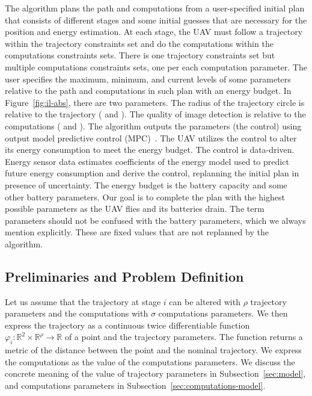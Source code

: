 \documentclass[letterpaper,10pt,conference]{ieeeconf}
\theoremstyle{definition}
\begin{document}
The algorithm plans the path and computations from a user-specified initial plan that consists of different stages and some initial guesses that are necessary for the position and energy estimation. At each stage, the UAV must follow a trajectory within the trajectory constraints set and do the computations within the computations constraints sets. There is one trajectory constraints set but multiple computations constraints sets, one per each computation parameter. The user specifies the maximum, minimum, and current levels of some parameters relative to the path and computations in such plan with an energy budget. In Figure~\ref{fig:il-abs}, there are two parameters. The radius of the trajectory circle is relative to the trajectory (\protect{} and \protect{}). The quality of image detection is relative to the computations (\protect{} and \protect{}). The algorithm outputs the parameters (the control) using output model predictive control (MPC)~\cite{rawlings2017model}. The UAV utilizes the control to alter its energy consumption to meet the energy budget. The control is data-driven. Energy sensor data estimates coefficients of the energy model used to predict future energy consumption and derive the control, replanning the initial plan in presence of uncertainty. The energy budget is the battery capacity and some other battery parameters. Our goal is to complete the plan with the highest possible parameters as the UAV flies and its batteries drain. The term parameters should not be confused with the battery parameters, which we always mention explicitly. These are fixed values that are not replanned by the algorithm. 


\subsection{Preliminaries and Problem Definition}
\label{sec:prelim}

Let us assume that the trajectory at stage $i$ can be altered with $\rho$ trajectory parameters and the computations with $\sigma$ computations parameters. We then express the trajectory as a continuous twice differentiable function $\varphi_i:\mathbb{R}^2\times\mathbb{R}^\rho\rightarrow\mathbb{R}$ of a point and the trajectory parameters. The function returns a metric of the distance between the point and the nominal trajectory. We express the computations as the value of the computations parameters. We discuss the concrete meaning of the value of trajectory parameters in Subsection~\ref{sec:model}, and computations parameters in Subsection~\ref{sec:computations-model}.
\end{document}
